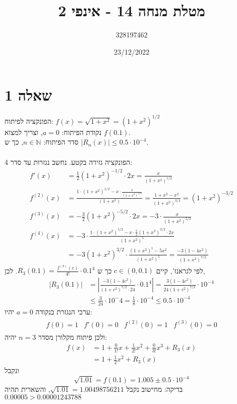 \documentclass{article}
\title{מטלת מנחה 14 - אינפי 2}
\author{328197462}
\date{23/12/2022}
\begin{document}
\long{}
\maketitle

\section*{שאלה 1}

הפונקציה לפיתוח: $f(x)=\sqrt{1+x^2}=(1+x^2)^{1/2}$ \\
נקודת הפיתוח: $a=0$, וצריך למצוא $f(0.1)$. \\
סדר הפיתוח: $n\in\mathbb{N}$, כך ש $|R_n(x)|\leq 0.5\cdot 10^{-4}$.
\\\\
הפונקציה גזירה בקטע. נחשב נגזרות עד סדר 4:
\begin{align*}
    f'(x)      & =\frac{1}{2} (1+x^2)^{-1/2} \cdot 2x = \frac{x}{(1+x^2)^{1/2}}                                                               \\
    f^{(2)}(x) & = \frac{1 \cdot (1+x^2)^{1/2} - x \cdot \frac{x}{(1+x^2)^{1/2}}}{(1+x^2)} = \frac{1+x^2-x^2}{(1+x^2)^{3/2}} = (1+x^2)^{-3/2} \\
    f^{(3)}(x) & = -\frac{3}{2} (1+x^2)^{-5/2} \cdot 2x = -3 \cdot \frac{x}{(1+x^2)^{5/2}}                                                    \\
    f^{(4)}(x) & = -3 \cdot \frac{1\cdot (1+x^2)^{5/2} - x \cdot \frac{5}{2}(1+x^2)^{3/2}\cdot 2x}{(1+x^2)^5}                                 \\
               & = -3(1+x^2)^{3/2} \cdot \frac{(1+x^2)^1-5x^2}{(1+x^2)^5} = \frac{-3(1-4x^2)}{(1+x^2)^{7/2}}
\end{align*}
לפי לגראנז', קיים $c\in (0, 0.1)$ כך ש $R_3(0.1)=\frac{f^{(4)}(c)}{4!}\cdot 0.1^4$. לכן,
\begin{align*}
    |R_3(0.1)| & = \left| \frac{-3(1-4c^2)}{(1+c^2)^{7/2}\cdot 24} \cdot 0.1^4 \right| =
    \frac{3(1-4c^2)}{24 (1+c^2)^{7/2}} \cdot 10^{-4}                                              \\
               & \leq \frac{3}{24} \cdot 10^-4 = \frac{1}{8} \cdot 10^{-4} \leq 0.5 \cdot 10^{-4}
\end{align*}
ערכי הנגזרת בנקודה $a=0$ יהיו:
\begin{align*}
    \begin{matrix}
        f(0)=1 & f'(0)=0 & f^{(2)}(0)=1 & f^{(3)}(0) = 0
    \end{matrix}
\end{align*}
ולכן פיתוח מקלורן מסדר $n=3$ יהיה:
\begin{align*}
    f(x) & =1 + \frac{0}{1!}x + \frac{1}{2!} x^2 + \frac{0}{3!} x^3 + R_3(x) \\
         & = 1 + \frac{1}{2}x^2 + R_3(x)
\end{align*}
ונקבל
\[
    \sqrt{1.01} = f(0.1) = 1.005 \pm 0.5 \cdot 10^{-4}
\]
בדיקה: מחישוב נקבל $\sqrt{1.01}=1.00498756211$, והשארית תהיה $0.00005>0.00001243788$
\end{document}
